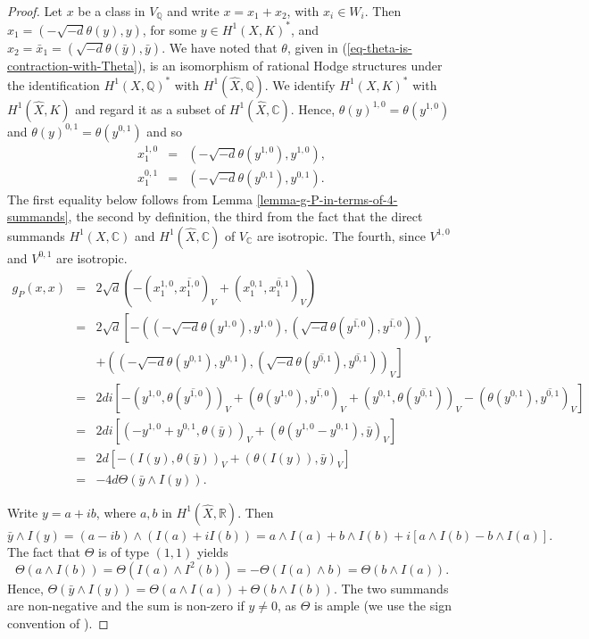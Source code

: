 \documentclass[12pt]{amsart}
\numberwithin{equation}{subsection}
\theoremstyle{plain}
\theoremstyle{definition}
\newcommand{\CC}{{\mathbb C}}
\newcommand{\QQ}{{\mathbb Q}}
\newcommand{\RR}{{\mathbb R}}
\newcommand{\Hom}{{\rm Hom}}
\begin{document}
\begin{proof}
Let $x$ be a class in $V_\QQ$ and write $x=x_1+x_2$, with $x_i\in W_i$. Then 
$x_1=(-\sqrt{-d}\theta(y),y)$, for some $y\in H^1(X,K)^*$, and $x_2=\bar{x}_1=(\sqrt{-d}\theta(\bar{y}),\bar{y})$.
We have noted that $\theta$, given in (\ref{eq-theta-is-contraction-with-Theta}), is an isomorphism of rational Hodge structures under the identification $H^1(X,\QQ)^*$ with $H^1(\hat{X},\QQ)$. We identify $H^1(X,K)^*$  with $H^1(\hat{X},K)$ and regard it as a subset of $H^1(\hat{X},\CC)$.
Hence, $\theta(y)^{1,0}=\theta(y^{1,0})$ and $\theta(y)^{0,1}=\theta(y^{0,1})$ and so
\begin{eqnarray*}
x_1^{1,0}&=&(-\sqrt{-d}\theta(y^{1,0}),y^{1,0}),
\\
x_1^{0,1}&=&(-\sqrt{-d}\theta(y^{0,1}),y^{0,1}).
\end{eqnarray*}
The first equality below follows from Lemma \ref{lemma-g-P-in-terms-of-4-summands}, the second by definition,  the third from 
the fact that the direct summands $H^1(X,\CC)$ and $H^1(\hat{X},\CC)$ of $V_\CC$ are isotropic. The fourth, since $V^{1,0}$ and $V^{0,1}$ are isotropic.
\begin{eqnarray*}
g_P(x,x)&=&2\sqrt{d}(-(x_1^{1,0},\overline{x_1^{1,0}})_V
+(x_1^{0,1},\overline{x_1^{0,1}})_V)
\\
&=&
2\sqrt{d}\left[
-((-\sqrt{-d}\theta(y^{1,0}),y^{1,0}),(\sqrt{-d}\theta(\overline{y^{1,0}}),\overline{y^{1,0}}))_V
\right.
\\
& & 
\left.
+
((-\sqrt{-d}\theta(y^{0,1}),y^{0,1}),(\sqrt{-d}\theta(\overline{y^{0,1}}),\overline{y^{0,1}}))_V
\right]
\\
&=& 2di\left[
-(y^{1,0},\theta(\overline{y^{1,0}}))_V
+(\theta(y^{1,0}),\overline{y^{1,0}})_V
+(y^{0,1},\theta(\overline{y^{0,1}}))_V
-(\theta(y^{0,1}),\overline{y^{0,1}})_V
\right]
\\
&=& 
2di\left[
(-y^{1,0}+y^{0,1},\theta(\bar{y}))_V+
(\theta(y^{1,0}-y^{0,1}),\bar{y})_V
\right]
\\
&=&
2d
\left[
-(I(y),\theta(\bar{y}))_V
+(\theta(I(y)),\bar{y})_V
\right]
\\
&=& -4d\Theta(\bar{y}\wedge I(y)).
\end{eqnarray*}

Write $y=a+ib$, where $a,b$ in $H^1(\hat{X},\RR)$. Then
$\bar{y}\wedge I(y)=(a-ib)\wedge(I(a)+iI(b))=a\wedge I(a)+b\wedge I(b)+i[a\wedge I(b)- b\wedge I(a)].$
The fact that $\Theta$ is of type $(1,1)$ yields
\[
\Theta(a\wedge I(b))=\Theta(I(a)\wedge I^2(b))=-\Theta(I(a)\wedge b)=\Theta(b\wedge I(a)).
\]
Hence, $\Theta(\bar{y}\wedge I(y))=\Theta(a\wedge I(a))+\Theta(b\wedge I(b))$.  The two summands are non-negative  and the sum is non-zero if $y\neq 0$, as $\Theta$ is ample (we use the sign convention of \cite[Lemma 1.2.15]{huybrechts-complex-geometry-book}).
\end{proof}
\end{document}

